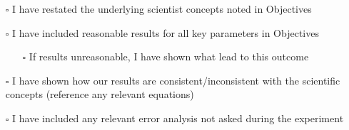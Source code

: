 \begin{itemize}
    \item[$\square$] I have restated the underlying scientist concepts noted in Objectives
    \item[$\square$] I have included reasonable results for all key parameters in Objectives
    	\begin{itemize}
	    \item[$\square$] If results unreasonable, I have shown what lead to this outcome
	\end{itemize}
    \item[$\square$] I have shown how our results are consistent/inconsistent with the scientific concepts (reference any relevant equations)
    \item[$\square$] I have included any relevant error analysis not asked during the experiment
\end{itemize}  


